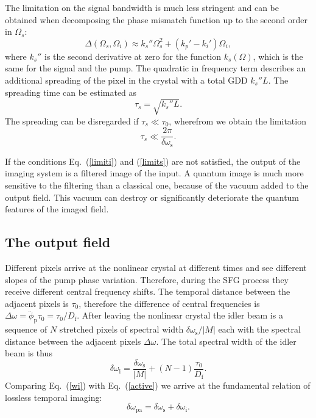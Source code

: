 \documentclass[10pt,twocolumn]{article}
\begin{document}
The limitation on the signal bandwidth is much less stringent and can be obtained when decomposing the phase mismatch function up to the second order in $\Omega_s$:
\begin{equation}\label{Dk4}
\Delta(\Omega_s,\Omega_i)\approx k_s''\Omega_s^2+(k_p'-k_i')\Omega_i,
\end{equation}
where $k_s''$ is the second derivative at zero for the function $k_s(\Omega)$, which is the same for the signal and the pump. The quadratic in frequency term describes an additional spreading of the pixel in the crystal with a total GDD $k_s''L$. The spreading time can be estimated as
\begin{equation}\label{taus}
\tau_s = \sqrt{k_s''L}.
\end{equation}
The spreading can be disregarded if $\tau_s \ll \tau_0$, wherefrom we obtain the limitation
\begin{equation}\label{limits}
\tau_s \ll \frac{2\pi}{\delta\omega_{\mathrm{s}}}.
\end{equation}

If the conditions Eq.~(\ref{limiti}) and (\ref{limits}) are not satisfied, the output of the imaging system is a filtered image of the input. A quantum image is much more sensitive to the filtering than a classical one, because of the vacuum added to the output field. This vacuum can destroy or significantly deteriorate the quantum features of the imaged field.

\subsection{The output field}

Different pixels arrive at the nonlinear crystal at different times and see different slopes of the pump phase variation. Therefore, during the SFG process they receive different central frequency shifts. The temporal distance between the adjacent pixels is $\tau_0$, therefore the difference of central frequencies is $\Delta\omega=\ddot\phi_{\mathrm{p}}\tau_0=\tau_0/D_{\mathrm{f}}$. After leaving the nonlinear crystal the idler beam is a sequence of $N$ stretched pixels of spectral width $\delta\omega_{\mathrm{s}}/|M|$ each with the spectral distance between the adjacent pixels $\Delta\omega$. The total spectral width of the idler beam is thus
\begin{equation}\label{wi}
\delta\omega_{\mathrm{i}} = \frac{\delta\omega_{\mathrm{s}}}{|M|}+(N-1)\frac{\tau_0}{D_{\mathrm{f}}}.
\end{equation}
Comparing Eq.~(\ref{wi}) with Eq.~(\ref{active}) we arrive at the fundamental relation of lossless temporal imaging:
\begin{equation}\label{rel}
\delta\omega_{\mathrm{pa}} = \delta\omega_{\mathrm{s}}+\delta\omega_{\mathrm{i}}.
\end{equation}
\end{document}
